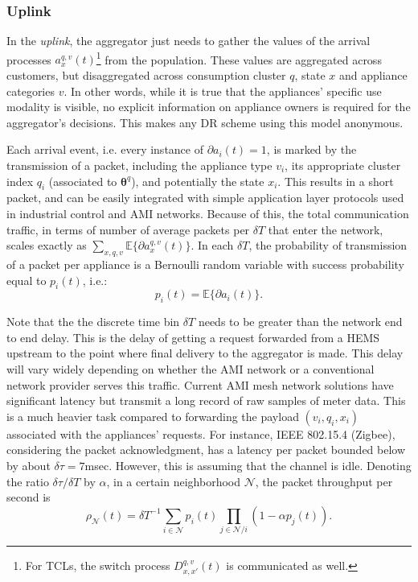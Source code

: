 \documentclass[10pt]{IEEEtran}
\begin{document}
\subsubsection{Uplink}
In the {\it uplink},  the aggregator just needs to gather the values of the arrival processes  $a^{q,v}_x(t)$\footnote{For TCLs, the switch process $D^{q,v}_{x,x'}(t)$ is communicated as well.} from the population. These values are aggregated across customers, but disaggregated across consumption cluster $q$, state $x$ and appliance categories $v$. In other words, 
while it is true that the appliances' specific use modality is visible, no explicit information on appliance owners is required for the aggregator's decisions. This makes any DR scheme using this model anonymous. 


Each arrival event, i.e. every instance of $\partial a_i(t)=1$, is marked by the transmission of a packet, including the appliance type $v_i$, its appropriate cluster index $q_i$ (associated to $\boldsymbol{\theta}^q$), and potentially the state $x_i$. This results in a short packet, and can be easily integrated with simple application layer protocols used in industrial control and AMI networks. 
Because of this, the total communication traffic, in terms of number of average packets per $\delta T$ that enter the network, scales exactly as  $\sum_{x,q,v}\mathbb{E}\{\partial a^{q,v}_x(t)\}$. In each $\delta T$, the probability of transmission of a packet per appliance is  a Bernoulli random variable with success probability equal to $p_i(t)$, i.e.:
\begin{equation}\label{rate}
p_i(t)=\mathbb{E}\{\partial a_i(t)\}.
 \end{equation}

 
Note that the the discrete time bin $\delta T$ needs to be greater than the network end to end delay. This is the delay of getting a request forwarded from a HEMS upstream to the point where final delivery to the aggregator is made. This delay will vary widely depending on whether the AMI network or a conventional network provider serves this traffic. Current AMI mesh network solutions have significant latency but transmit a long record of raw samples of meter data. This is a much heavier task compared to forwarding the payload $(v_i,q_i,x_i)$ associated with the appliances' requests.   
For instance, IEEE 802.15.4 (Zigbee), considering the packet acknowledgment, has a latency per packet bounded below by about $\delta \tau= 7$msec. However, this is assuming that the channel is idle. Denoting the ratio $\delta \tau/\delta T$ by $\alpha$, in a certain neighborhood $\mathcal N$, the packet throughput per second is 
\begin{equation}\label{ratemac}\rho_{\mathcal N}(t)=\delta T^{-1}\sum_{i\in {\mathcal N}}p_i(t)\prod_{j\in {\mathcal N}/i}(1-\alpha p_j(t)).\end{equation} 
\end{document}
